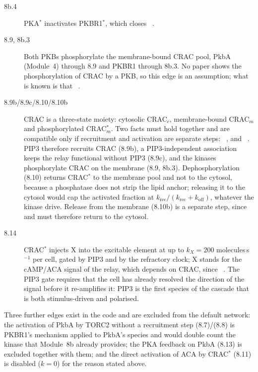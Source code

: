 \begin{description}
\item[8b.4] PKA$^*$ inactivates PKBR1$^*$, which closes ~\cite{scavello2017}.
\item[8.9, 8b.3] Both PKBs phosphorylate the membrane-bound CRAC pool, PkbA (Module~4) through 8.9 and PKBR1 through 8b.3. No paper shows the phosphorylation of CRAC by a PKB, so this edge is an assumption; what is known is that ~\cite{cai2010,comer2005}.
\item[8.9b/8.9c/8.10/8.10b] CRAC is a three-state moiety: cytosolic CRAC$_c$, membrane-bound CRAC$_m$ and phosphorylated CRAC$_m^*$. Two facts must hold together and are compatible only if recruitment and activation are separate steps: ~\cite{parent1998,comer2005}, and ~\cite{kamimura2008}. PIP3 therefore recruits CRAC (8.9b), a PIP3-independent association keeps the relay functional without PIP3 (8.9c), and the kinases phosphorylate CRAC on the membrane (8.9, 8b.3). Dephosphorylation (8.10) returns CRAC$^*$ to the membrane pool and not to the cytosol, because a phosphatase does not strip the lipid anchor; releasing it to the cytosol would cap the activated fraction at $k_\mathrm{rec}/(k_\mathrm{rec}+k_\mathrm{off})$, whatever the kinase drive. Release from the membrane (8.10b) is a separate step, since ~\cite{parent1998} and must therefore return to the cytosol.
\item[8.14] CRAC$^*$ injects X into the excitable element at up to $k_X=200$ molecules\,s$^{-1}$ per cell, gated by PIP3 and by the refractory clock; X stands for the cAMP/ACA signal of the relay, which depends on CRAC, since ~\cite{insall1994}. The PIP3 gate requires that the cell has already resolved the direction of the signal before it re-amplifies it: PIP3 is the first species of the cascade that is both stimulus-driven and polarised.
\end{description}
Three further edges exist in the code and are excluded from the default network:
the activation of PkbA by TORC2 without a recruitment step (8.7)/(8.8) is PKBR1's mechanism applied to PkbA's species and would double count the kinase that Module~8b already provides;
the PKA feedback on PkbA (8.13) is excluded together with them;
and the direct activation of ACA by CRAC$^*$ (8.11) is disabled ($k=0$) for the reason stated above.

